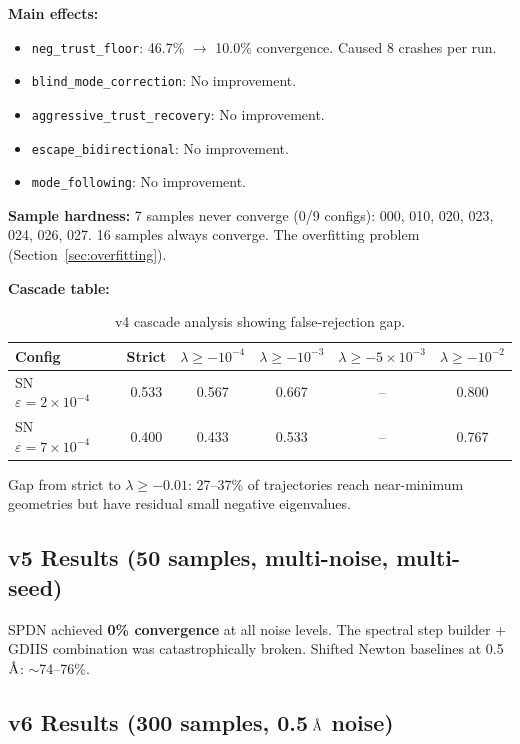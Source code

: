 \documentclass[11pt,a4paper]{article}
\newcommand{\eval}{\lambda}
\newcommand{\angstrom}{\text{\r{A}}}
\begin{document}
\textbf{Main effects:}
\begin{itemize}
  \item \texttt{neg\_trust\_floor}: 46.7\% $\to$ 10.0\% convergence. Caused 8 crashes per run.
  \item \texttt{blind\_mode\_correction}: No improvement.
  \item \texttt{aggressive\_trust\_recovery}: No improvement.
  \item \texttt{escape\_bidirectional}: No improvement.
  \item \texttt{mode\_following}: No improvement.
\end{itemize}

\textbf{Sample hardness:} 7 samples never converge (0/9 configs): 000, 010, 020, 023, 024, 026, 027. 16 samples always converge. The overfitting problem (Section~\ref{sec:overfitting}).

\textbf{Cascade table:}
\begin{table}[H]
\centering
\caption{v4 cascade analysis showing false-rejection gap.}
\label{tab:v4-cascade}
\begin{tabular}{lccccc}
\toprule
Config & Strict & $\eval\geq -10^{-4}$ & $\eval\geq -10^{-3}$ & $\eval\geq -5\times10^{-3}$ & $\eval\geq -10^{-2}$ \\
\midrule
SN $\varepsilon=2\times10^{-4}$ & 0.533 & 0.567 & 0.667 & -- & 0.800 \\
SN $\varepsilon=7\times10^{-4}$ & 0.400 & 0.433 & 0.533 & -- & 0.767 \\
\bottomrule
\end{tabular}
\end{table}

Gap from strict to $\eval\geq -0.01$: 27--37\% of trajectories reach near-minimum geometries but have residual small negative eigenvalues.

\subsection{v5 Results (50 samples, multi-noise, multi-seed)}

SPDN achieved \textbf{0\% convergence} at all noise levels. The spectral step builder + GDIIS combination was catastrophically broken. Shifted Newton baselines at 0.5\,$\angstrom$: $\sim$74--76\%.

\subsection{v6 Results (300 samples, 0.5\,$\angstrom$ noise)}
\label{sec:v6-results}
\end{document}
